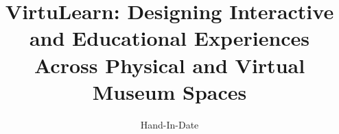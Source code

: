 \documentclass[a4paper, 10pt, oneside]{memoir}
\title				{VirtuLearn: Designing Interactive and Educational Experiences Across Physical and Virtual Museum Spaces}
\date				{Hand-In-Date}
\begin{document}

\thesisfront
\maketitle
\pagestyle{thesis}
% 

\thesistoc
\thesismain







\thesisappendix
\thesisbib

\begin{appendices}
	 
\end{appendices}
\thesisback
{}
  {}
  {}
\end{document}
